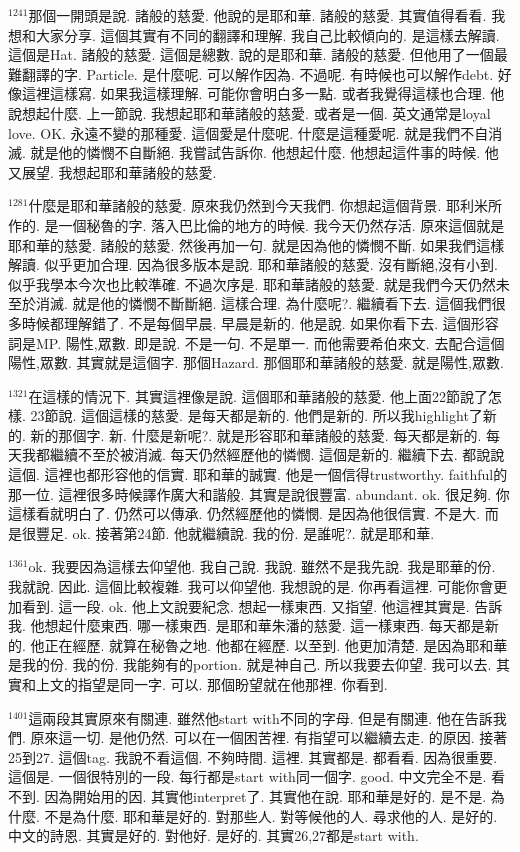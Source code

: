 \documentclass{book}
\begin{document}
$^{1241}$那個一開頭是說.
諸般的慈愛.
他說的是耶和華.
諸般的慈愛.
其實值得看看.
我想和大家分享.
這個其實有不同的翻譯和理解.
我自己比較傾向的.
是這樣去解讀.
這個是Hat.
諸般的慈愛.
這個是總數.
說的是耶和華.
諸般的慈愛.
但他用了一個最難翻譯的字.
Particle.
是什麼呢.
可以解作因為.
不過呢.
有時候也可以解作debt.
好像這裡這樣寫.
如果我這樣理解.
可能你會明白多一點.
或者我覺得這樣也合理.
他說想起什麼.
上一節說.
我想起耶和華諸般的慈愛.
或者是一個.
英文通常是loyal love.
OK.
永遠不變的那種愛.
這個愛是什麼呢.
什麼是這種愛呢.
就是我們不自消滅.
就是他的憐憫不自斷絕.
我嘗試告訴你.
他想起什麼.
他想起這件事的時候.
他又展望.
我想起耶和華諸般的慈愛.

$^{1281}$什麼是耶和華諸般的慈愛.
原來我仍然到今天我們.
你想起這個背景.
耶利米所作的.
是一個秘魯的字.
落入巴比倫的地方的時候.
我今天仍然存活.
原來這個就是耶和華的慈愛.
諸般的慈愛.
然後再加一句.
就是因為他的憐憫不斷.
如果我們這樣解讀.
似乎更加合理.
因為很多版本是說.
耶和華諸般的慈愛.
沒有斷絕,沒有小到.
似乎我學本今次也比較準確.
不過次序是.
耶和華諸般的慈愛.
就是我們今天仍然未至於消滅.
就是他的憐憫不斷斷絕.
這樣合理.
為什麼呢?.
繼續看下去.
這個我們很多時候都理解錯了.
不是每個早晨.
早晨是新的.
他是說.
如果你看下去.
這個形容詞是MP.
陽性,眾數.
即是說.
不是一句.
不是單一.
而他需要希伯來文.
去配合這個陽性,眾數.
其實就是這個字.
那個Hazard.
那個耶和華諸般的慈愛.
就是陽性,眾數.

$^{1321}$在這樣的情況下.
其實這裡像是說.
這個耶和華諸般的慈愛.
他上面22節說了怎樣.
23節說.
這個這樣的慈愛.
是每天都是新的.
他們是新的.
所以我highlight了新的.
新的那個字.
新.
什麼是新呢?.
就是形容耶和華諸般的慈愛.
每天都是新的.
每天我都繼續不至於被消滅.
每天仍然經歷他的憐憫.
這個是新的.
繼續下去.
都說說這個.
這裡也都形容他的信實.
耶和華的誠實.
他是一個信得trustworthy.
faithful的那一位.
這裡很多時候譯作廣大和諧般.
其實是說很豐富.
abundant.
ok.
很足夠.
你這樣看就明白了.
仍然可以傳承.
仍然經歷他的憐憫.
是因為他很信實.
不是大.
而是很豐足.
ok.
接著第24節.
他就繼續說.
我的份.
是誰呢?.
就是耶和華.

$^{1361}$ok.
我要因為這樣去仰望他.
我自己說.
我說.
雖然不是我先說.
我是耶華的份.
我就說.
因此.
這個比較複雜.
我可以仰望他.
我想說的是.
你再看這裡.
可能你會更加看到.
這一段.
ok.
他上文說要紀念.
想起一樣東西.
又指望.
他這裡其實是.
告訴我.
他想起什麼東西.
哪一樣東西.
是耶和華朱潘的慈愛.
這一樣東西.
每天都是新的.
他正在經歷.
就算在秘魯之地.
他都在經歷.
以至到.
他更加清楚.
是因為耶和華是我的份.
我的份.
我能夠有的portion.
就是神自己.
所以我要去仰望.
我可以去.
其實和上文的指望是同一字.
可以.
那個盼望就在他那裡.
你看到.

$^{1401}$這兩段其實原來有關連.
雖然他start with不同的字母.
但是有關連.
他在告訴我們.
原來這一切.
是他仍然.
可以在一個困苦裡.
有指望可以繼續去走.
的原因.
接著25到27.
這個tag.
我說不看這個.
不夠時間.
這裡.
其實都是.
都看看.
因為很重要.
這個是.
一個很特別的一段.
每行都是start with同一個字.
good.
中文完全不是.
看不到.
因為開始用的因.
其實他interpret了.
其實他在說.
耶和華是好的.
是不是.
為什麼.
不是為什麼.
耶和華是好的.
對那些人.
對等候他的人.
尋求他的人.
是好的.
中文的詩恩.
其實是好的.
對他好.
是好的.
其實26,27都是start with.
\end{document}
